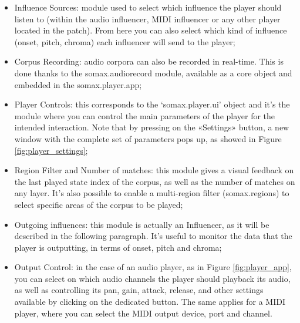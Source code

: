 \begin{itemize}
    \item Influence Sources: module used to select which influence the player should listen to (within the audio influencer, MIDI influencer or any other player located in the patch). From here you can also select which kind of influence (onset, pitch, chroma) each influencer will send to the player;
    \item Corpus Recording: audio corpora can also be recorded in real-time. This is done thanks to the somax.audiorecord module, available as a core object and embedded in the somax.player.app;
    \item Player Controls: this corresponds to the `somax.player.ui' object and it's the module where you can control the main parameters of the player for the intended interaction. Note that by pressing on the «Settings» button, a new window with the complete set of parameters pops up, as showed in Figure \ref{fig:player_settings};
    \item Region Filter and Number of matches: this module gives a visual feedback on the last played state index of the corpus, as well as the number of matches on any layer. It's also possible to enable a multi-region filter (somax.regions) to select specific areas of the corpus to be played;
    \item Outgoing influences: this module is actually an Influencer, as it will be described in the following paragraph. It's useful to monitor the data that the player is outputting, in terms of onset, pitch and chroma;
    \item Output Control: in the case of an audio player, as in Figure \ref{fig:player_app}, you can select on which audio channels the player should playback its audio, as well as controlling its pan, gain, attack, release, and other settings available by clicking on the dedicated button. The same applies for a MIDI player, where you can select the MIDI output device, port and channel.
\end{itemize}

